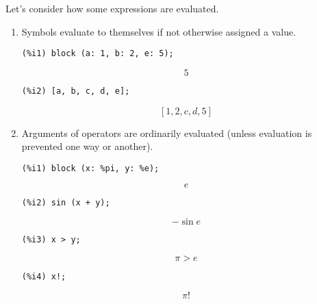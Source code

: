 \documentclass[12pt,leqno]{article}
\begin{document}
Let's consider how some expressions are evaluated.

\begin{enumerate}

\item Symbols evaluate to themselves if not otherwise assigned a value.
\begin{verbatim}
(%i1) block (a: 1, b: 2, e: 5);
\end{verbatim}
\begin{dmath}[number={\(\mathop{\mathrm{\%o}_{1}}\)}]
5
\end{dmath}
\begin{verbatim}
(%i2) [a, b, c, d, e];
\end{verbatim}
\begin{dmath}[number={\(\mathop{\mathrm{\%o}_{2}}\)}]
\left[1, 2, c, d, 5\right]
\end{dmath}


\item Arguments of operators are ordinarily evaluated (unless evaluation is prevented one way or another).
\begin{verbatim}
(%i1) block (x: %pi, y: %e);
\end{verbatim}
\begin{dmath}[number={\(\mathop{\mathrm{\%o}_{1}}\)}]
e
\end{dmath}
\begin{verbatim}
(%i2) sin (x + y);
\end{verbatim}
\begin{dmath}[number={\(\mathop{\mathrm{\%o}_{2}}\)}]
-\sin e
\end{dmath}
\begin{verbatim}
(%i3) x > y;
\end{verbatim}
\begin{dmath}[number={\(\mathop{\mathrm{\%o}_{3}}\)}]
\pi > e
\end{dmath}
\begin{verbatim}
(%i4) x!;
\end{verbatim}
\begin{dmath}[number={\(\mathop{\mathrm{\%o}_{4}}\)}]
\pi!
\end{dmath}



\end{enumerate}
\end{document}
